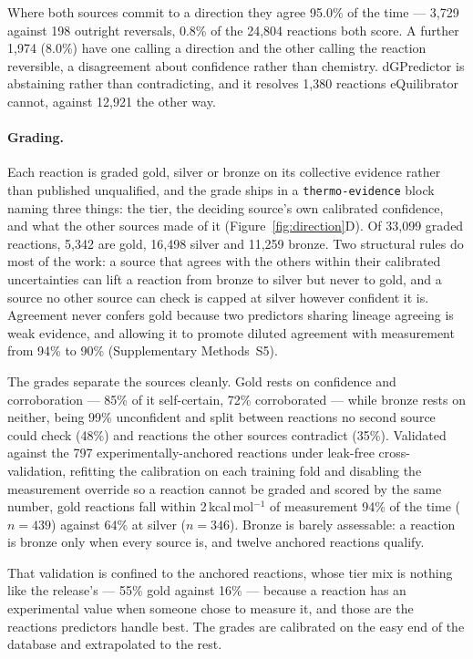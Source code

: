 Where both sources commit to a direction they agree 95.0\% of the time --- 3,729
against 198 outright reversals, 0.8\% of the 24,804 reactions both score. A
further 1,974 (8.0\%) have one calling a direction and the other calling the
reaction reversible, a disagreement about confidence rather than chemistry.
dGPredictor is abstaining rather than contradicting, and it resolves 1,380
reactions eQuilibrator cannot, against 12,921 the other way.

\paragraph{Grading.} Each reaction is graded gold, silver or bronze on its
collective evidence rather than published unqualified, and the grade ships in a
\texttt{thermo-evidence} block naming three things: the tier, the deciding
source's own calibrated confidence, and what the other sources made of it
(Figure~\ref{fig:direction}D). Of 33,099 graded reactions, 5,342 are gold,
16,498 silver and 11,259 bronze. Two structural rules do most of the work: a
source that agrees with the others within their calibrated uncertainties can
lift a reaction from bronze to silver but never to gold, and a source no other
source can check is capped at silver however confident it is. Agreement never
confers gold because two predictors sharing lineage agreeing is weak evidence,
and allowing it to promote diluted agreement with measurement from 94\% to 90\%
(Supplementary Methods~S5).

The grades separate the sources cleanly. Gold rests on confidence and
corroboration --- 85\% of it self-certain, 72\% corroborated --- while bronze
rests on neither, being 99\% unconfident and split between reactions no second
source could check (48\%) and reactions the other sources contradict (35\%).
Validated against the 797 experimentally-anchored reactions under leak-free
cross-validation, refitting the calibration on each training fold and disabling
the measurement override so a reaction cannot be graded and scored by the same
number, gold reactions fall within 2\,kcal\,mol$^{-1}$ of measurement 94\% of
the time ($n=439$) against 64\% at silver ($n=346$). Bronze is barely
assessable: a reaction is bronze only when every source is, and twelve anchored
reactions qualify.

That validation is confined to the anchored reactions, whose tier mix is nothing
like the release's --- 55\% gold against 16\% --- because a reaction has an
experimental value when someone chose to measure it, and those are the reactions
predictors handle best. The grades are calibrated on the easy end of the
database and extrapolated to the rest.

